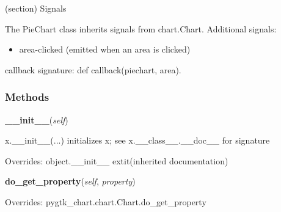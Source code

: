 (section) Signals

  The PieChart class inherits signals from chart.Chart. Additional signals:

  \begin{itemize}
  \setlength{\parskip}{0.6ex}
    \item area-clicked (emitted when an area is clicked)

  \end{itemize}

  callback signature: def callback(piechart, area).



  \subsubsection{Methods}

    \vspace{0.5ex}

\hspace{.8\funcindent}\begin{boxedminipage}{\funcwidth}

    \raggedright \textbf{\_\_init\_\_}(\textit{self})

\setlength{\parskip}{2ex}
    x.\_\_init\_\_(...) initializes x; see x.\_\_class\_\_.\_\_doc\_\_ for 
    signature

\setlength{\parskip}{1ex}
      Overrides: object.\_\_init\_\_ 	extit{(inherited documentation)}

    \end{boxedminipage}

    \vspace{0.5ex}

\hspace{.8\funcindent}\begin{boxedminipage}{\funcwidth}

    \raggedright \textbf{do\_get\_property}(\textit{self}, \textit{property})

\setlength{\parskip}{2ex}
\setlength{\parskip}{1ex}
      Overrides: pygtk\_chart.chart.Chart.do\_get\_property

    \end{boxedminipage}

    \vspace{0.5ex}

